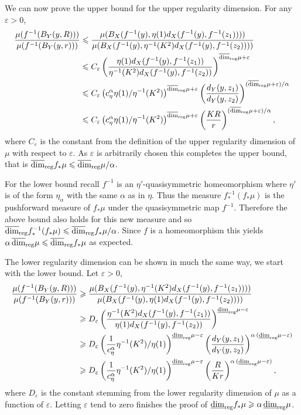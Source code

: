 We can now prove the upper bound for the upper regularity dimension. For any $\varepsilon > 0$,
\begin{align*}
\frac{\mu(f^{-1}(B_Y(y,R)))}{\mu(f^{-1}(B_Y(y,r)))} &\leqslant \frac{\mu(B_X(f^{-1}(y),\eta(1)d_X(f^{-1}(y), f^{-1}(z_1)) ))}{\mu(B_X(f^{-1}(y),\eta^{-1}(K^2)d_X(f^{-1}(y),f^{-1}(z_2)) ))} \\
& \leqslant C_{\varepsilon}\left( \frac{\eta(1)d_X(f^{-1}(y),f^{-1}(z_1))}{\eta^{-1}(K^2)d_X(f^{-1}(y),f^{-1}(z_2))}\right)^{\overline{\dim}_{\textup{reg}} \mu + \varepsilon} \\
& \leqslant C_{\varepsilon}\left(c_\eta^{\alpha} \eta(1)/\eta^{-1}(K^2)\right)^{\overline{\dim}_{\textup{reg}} \mu + \varepsilon} \left(\frac{d_Y(y,z_1)}{d_Y(y,z_2)} \right)^{(\overline{\dim}_{\textup{reg}} \mu + \varepsilon)  / \alpha} \\
& \leqslant C_{\varepsilon}\left(c_\eta^{\alpha} \eta(1)/\eta^{-1}(K^2)\right)^{\overline{\dim}_{\textup{reg}} \mu + \varepsilon} \left(\frac{KR}{r} \right)^{(\overline{\dim}_{\textup{reg}} \mu +\varepsilon)/ \alpha},
\end{align*}
where $C_{\varepsilon}$ is the constant from the definition of the upper regularity dimension of $\mu$ with respect to $\varepsilon$. As $\varepsilon$ is arbitrarily chosen this completes the upper bound, that is $\overline{\dim}_{\textup{reg}} f_*\mu \leqslant \overline{\dim}_{\textup{reg}} \mu / \alpha$.
	
For the lower bound recall $f^{-1}$ is an $\eta'$-quasisymmetric homeomorphism where $\eta'$ is of the form $\eta_\alpha$ with the same $\alpha$ as in $\eta$. Thus the measure $f^{-1}_* (f_*\mu)$ is the pushforward measure of $f_*\mu$ under the quasisymmetric map $f^{-1}$. Therefore the above bound also holds for this new measure and so $\overline{\dim}_{\textup{reg}} f^{-1}_* (f_*\mu) \leqslant \overline{\dim}_{\textup{reg}} f_* \mu / \alpha$. Since $f$ is a homeomorphism this yields $\alpha\, \overline{\dim}_{\textup{reg}} \mu \leqslant \overline{\dim}_{\textup{reg}} f_* \mu$ as expected. 


The lower regularity dimension can be shown in much the same way, we start with the lower bound. Let $\varepsilon > 0$,
\begin{align*}
\frac{\mu(f^{-1}(B_Y(y,R)))}{\mu(f^{-1}(B_Y(y,r)))} &\geqslant \frac{\mu(B_X(f^{-1}(y),\eta^{-1}(K^2)d_X(f^{-1}(y),f^{-1}(z_1)) ))}{\mu(B_X(f^{-1}(y),\eta(1)d_X(f^{-1}(y), f^{-1}(z_2)) ))} \\
& \geqslant D_{\varepsilon}\left( \frac{\eta^{-1}(K^2)d_X(f^{-1}(y),f^{-1}(z_1))}{\eta(1)d_X(f^{-1}(y),f^{-1}(z_2))}\right)^{\underline{\dim}_{\textup{reg}} \mu - \varepsilon} \\
& \geqslant D_{\varepsilon}\left(\frac{1}{c_\eta^{\alpha}} \eta^{-1}(K^2)/\eta(1)\right)^{\underline{\dim}_{\textup{reg}} \mu - \varepsilon} \left(\frac{d_Y(y,z_1)}{d_Y(y,z_2)} \right)^{\alpha \,(\underline{\dim}_{\textup{reg}} \mu - \varepsilon)} \\
& \geqslant D_{\varepsilon}\left(\frac{1}{c_\eta^{\alpha}} \eta^{-1}(K^2)/\eta(1)\right)^{\underline{\dim}_{\textup{reg}} \mu - \varepsilon} \left(\frac{R}{K r} \right)^{\alpha \,(\underline{\dim}_{\textup{reg}} \mu - \varepsilon)},
\end{align*}
where $D_\varepsilon$ is the constant stemming from the lower regularity dimension of $\mu$ as a function of $\varepsilon$. Letting $\varepsilon$ tend to zero finishes the proof of $\underline{\dim}_{\textup{reg}} f_*\mu \geqslant \alpha \, \underline{\dim}_{\textup{reg}} \mu$.

